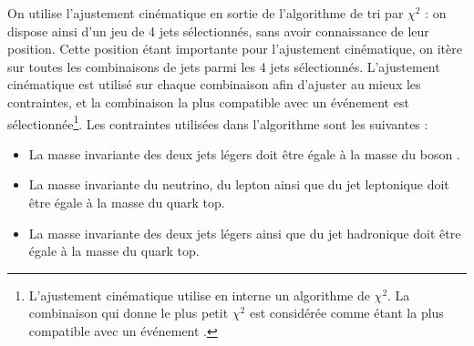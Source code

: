 On utilise l'ajustement cinématique en sortie de l'algorithme de tri par $\chi^2$ : on dispose ainsi d'un jeu de 4 jets sélectionnés, sans avoir connaissance de leur position. Cette position étant importante pour l'ajustement cinématique, on itère sur toutes les combinaisons de jets parmi les 4 jets sélectionnés. L'ajustement cinématique est utilisé sur chaque combinaison afin d'ajuster au mieux les contraintes, et la combinaison la plus compatible avec un événement \ttbar est sélectionnée\footnote{L'ajustement cinématique utilise en interne un algorithme de $\chi^2$. La combinaison qui donne le plus petit $\chi^2$ est considérée comme étant la plus compatible avec un événement \ttbar.}. Les contraintes utilisées dans l'algorithme sont les suivantes :
\begin{itemize}
    \item La masse invariante des deux jets légers doit être égale à la masse du boson \PW.
    \item La masse invariante du neutrino, du lepton ainsi que du jet \Pbottom leptonique doit être égale à la masse du quark top.
    \item La masse invariante des deux jets légers ainsi que du jet \Pbottom hadronique doit être égale à la masse du quark top.
\end{itemize}


